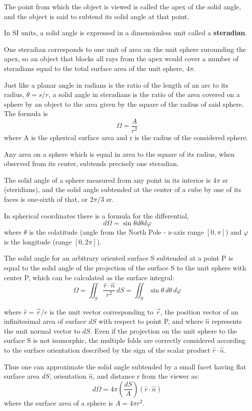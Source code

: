 The point from which the object is viewed is called the apex of the solid angle,
and the object is said to subtend its solid angle at that point.

In SI units, a solid angle is expressed in a dimensionless unit called a \textbf{steradian}.

One steradian corresponds to one unit of area on the unit sphere surounding the apex,
so an object that blocks all rays from the apex would cover a number of steradians equal
to the total surface area of the unit sphere, $4\pi$.


Just like a planar angle in radians is the ratio of the length of an arc to its radius, $\theta = s/r$,
a solid angle in steradians is the ratio of the area covered on a sphere by an object to the area given
by the square of the radius of said sphere. The formula is
$$
\Omega = \frac{A}{r^2}
$$
where A is the spherical surface area and r is the radius of the considered sphere.

Any area on a sphere which is equal in area to the square of its radius,
when observed from its center, subtends precisely one steradian.

The solid angle of a sphere measured from any point in its interior is $4\pi$ sr (steridians),
and the solid angle subtended at the center of a cube by one of its faces is one-sixth of that,
or $2\pi/3$ sr.

In spherical coordinates there is a formula for the differential,
$$
d\Omega = \sin \theta d\theta d\varphi 
$$
where $\theta$ is the colatitude (angle from the North Pole - z-axis range $[0,\pi]$)
and $\varphi$ is the longitude (range $[0,2\pi]$).

The solid angle for an arbitrary oriented surface S subtended at a point P is equal to
the solid angle of the projection of the surface S to the unit sphere with center P,
which can be calculated as the surface integral:
$$
\Omega =\iint _{S} \frac{\hat{r}\cdot\hat{n}}{r^2} \,dS
= \iint_{S} \sin \theta \,d\theta \,d\varphi
$$

where $\hat{r} = \vec{r}/r$ is the unit vector corresponding to $\vec {r}$,
the position vector of an infinitesimal area of surface $dS$ with respect to point P,
and where $\hat{n}$ represents the unit normal vector to $dS$.
Even if the projection on the unit sphere to the surface S is not isomorphic,
the multiple folds are correctly considered according to the surface orientation
described by the sign of the scalar product $\hat{r}\cdot\hat{n}$.

Thus one can approximate the solid angle subtended by a small facet having flat surface area
$dS$, orientation $\hat{n}$, and distance r from the viewer as:
$$
d\Omega = 4\pi \left( \frac{dS}{A} \right) (\hat{r}\cdot\hat{n})
$$
where the surface area of a sphere is $A = 4\pi r^2$.


